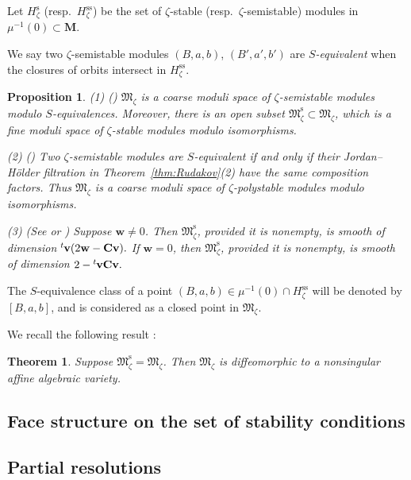 \documentclass[10pt,a4paper]{amsart}
\newtheorem{Theorem}[equation]{Theorem}
\newtheorem{Proposition}[equation]{Proposition}
\theoremstyle{definition}
\numberwithin{equation}{section}
\newcommand{\lsp}[2]{{\mskip-.3mu}{}^{#1}\mskip-1mu{#2}}
\newcommand{\bM}{{\mathbf M}} %
\newcommand{\M}{{\mathfrak M}} %
\newcommand{\Mreg}{\M^{\operatorname{s}}}
\newcommand{\bv}{{\mathbf v}} %
\newcommand{\bw}{{\mathbf w}} %
\newcommand{\bC}{{\mathbf C}} %
\begin{document}
Let $H_{\zeta}^{\operatorname{s}}$ (resp.\
$H_{\zeta}^{\operatorname{ss}}$) be the set of
$\zeta$-stable (resp.\ $\zeta$-semistable) modules in
$\mu^{-1}(0)\subset\bM$.

We say two $\zeta$-semistable modules $(B,a,b)$, $(B',a',b')$
are {\it $S$-equivalent\/} when the closures of orbits intersect in
$H_{\zeta}^{\operatorname{ss}}$.

\begin{Proposition}\label{prop:dim}
  \textup{(1) (\cite{King})} $\M_\zeta$ is a coarse moduli space of
  $\zeta$-semistable modules modulo $S$-equivalences.
%
  Moreover, there is an open subset $\Mreg_\zeta\subset\M_\zeta$,
  which is a fine moduli space of $\zeta$-stable modules modulo
  isomorphisms.

  \textup{(2) (\cite{King})} Two $\zeta$-semistable modules are
  $S$-equivalent if and only if their Jordan--H\"older filtration
  in Theorem~{\rm \ref{thm:Rudakov}(2)} have the same composition factors. Thus
  $\M_\zeta$ is a coarse moduli space of $\zeta$-polystable modules
  modulo isomorphisms.

  \textup{(3) (See \cite[2.6]{Na-quiver} or \cite[{3.12}]{Na-alg})}
  Suppose $\bw \neq 0$. Then
  $\Mreg_\zeta$, provided it is nonempty, is smooth of dimension
\(
   \lsp{t}{\bv}(2\bw - \bC \bv).
\)
If $\bw = 0$, then $\Mreg_\zeta$, provided it is nonempty, is smooth
of dimension
\(
   2 - \lsp{t}{\bv}\bC \bv.
\)
\end{Proposition}

The $S$-equivalence class of a point $(B,a,b)\in\mu^{-1}(0)\cap
H_{\zeta}^{\operatorname{ss}}$ will be denoted by $[B,a,b]$, and is
considered as a closed point in $\M_\zeta$.



We recall the following result \cite[3.1, 4.2]{Na-quiver}:

\begin{Theorem}\label{thm:affine}
  Suppose $\Mreg_\zeta = \M_\zeta$. Then $\M_\zeta$ is diffeomorphic
  to a nonsingular affine algebraic variety.
\end{Theorem}

\subsection{Face structure on the set of stability conditions}

\subsection{Partial resolutions}\label{subsec:partial}
\end{document}
